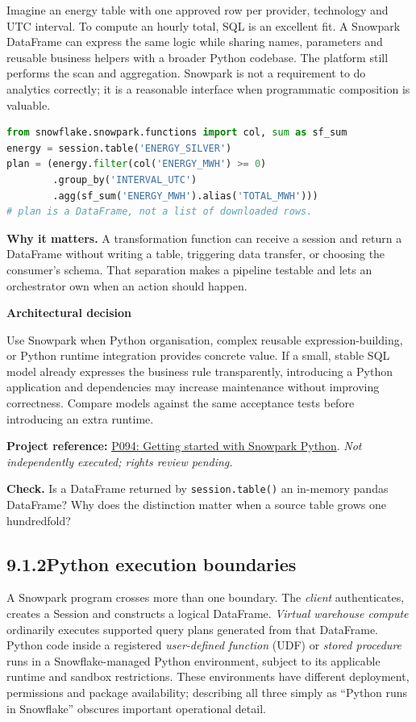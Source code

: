 \documentclass[11pt,twoside]{article}
\newcommand{\topic}[2]{\subsection*{#1\quad #2}}
\newcommand{\repo}[2]{\par\begingroup\fontsize{8.0}{9.6}\selectfont\sffamily\color{inkgray}\textbf{Project reference:} \href{#2}{#1}. \textit{Not independently executed; rights review pending.}\par\endgroup}
\begin{document}
Imagine an energy table with one approved row per provider, technology and UTC interval. To compute an hourly total, SQL is an excellent fit. A Snowpark DataFrame can express the same logic while sharing names, parameters and reusable business helpers with a broader Python codebase. The platform still performs the scan and aggregation. Snowpark is not a requirement to do analytics correctly; it is a reasonable interface when programmatic composition is valuable.
\begin{lstlisting}[language=Python,caption={Declarative query construction; cloud execution is not performed here.}]
from snowflake.snowpark.functions import col, sum as sf_sum
energy = session.table('ENERGY_SILVER')
plan = (energy.filter(col('ENERGY_MWH') >= 0)
        .group_by('INTERVAL_UTC')
        .agg(sf_sum('ENERGY_MWH').alias('TOTAL_MWH')))
# plan is a DataFrame, not a list of downloaded rows.
\end{lstlisting}
\textbf{Why it matters.} A transformation function can receive a session and return a DataFrame without writing a table, triggering data transfer, or choosing the consumer's schema. That separation makes a pipeline testable and lets an orchestrator own when an action should happen.
\begin{whitebox}\textbf{Architectural decision}\par
Use Snowpark when Python organisation, complex reusable expression-building, or Python runtime integration provides concrete value. If a small, stable SQL model already expresses the business rule transparently, introducing a Python application and dependencies may increase maintenance without improving correctness. Compare models against the same acceptance tests before introducing an extra runtime.\end{whitebox}
\repo{P094: Getting started with Snowpark Python}{https://github.com/Snowflake-Labs/sfguide-getting-started-snowpark-python}
\textbf{Check.} Is a DataFrame returned by \texttt{session.table()} an in-memory pandas DataFrame? Why does the distinction matter when a source table grows one hundredfold?
\newpage
\topic{9.1.2}{Python execution boundaries}
A Snowpark program crosses more than one boundary. The \emph{client} authenticates, creates a Session and constructs a logical DataFrame. \emph{Virtual warehouse compute} ordinarily executes supported query plans generated from that DataFrame. Python code inside a registered \emph{user-defined function} (UDF) or \emph{stored procedure} runs in a Snowflake-managed Python environment, subject to its applicable runtime and sandbox restrictions. These environments have different deployment, permissions and package availability; describing all three simply as ``Python runs in Snowflake'' obscures important operational detail.
\end{document}
